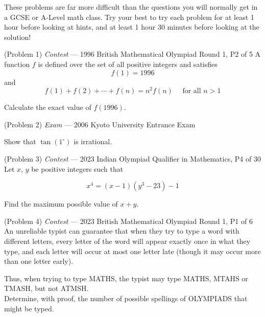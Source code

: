 \documentclass{article}
\begin{document}
These problems are far more difficult than the questions you will normally get in a GCSE or A-Level math class. Try your best to try each problem for at least 1 hour
before looking at hints, and at least 1 hour 30 minutes before looking at the solution!

\begin{problem}{(Problem 1) \textit{Contest} --- 1996 British Mathematical Olympiad Round 1, P2 of 5}
A function $f$ is defined over the set of all positive integers and satisfies
$$
f(1)=1996
$$
and
$$
f(1)+f(2)+\cdots+f(n)=n^2 f(n) \quad \text { for all } n>1
$$

Calculate the exact value of $f(1996)$.
\vspace{0.5cm}
\end{problem}

\vspace{-0.5cm}
\begin{problem}{(Problem 2) \textit{Exam} --- 2006 Kyoto University Entrance Exam}
\begin{center}
Show that $\tan(1^{\circ})$ is irrational.
\end{center}
\vspace{0.5cm}
\end{problem}

\vspace{-0.5cm}
\begin{problem}{(Problem 3) \textit{Contest} --- 2023 Indian Olympiad Qualifier in Mathematics, P4 of 30}
Let $x$, $y$ be positive integers such that

$$
x^4 = (x - 1)(y^3 - 23) - 1
$$

Find the maximum possible value of $x+y$.
\vspace{0.5cm}
\end{problem}

\vspace{-0.5cm}
\begin{problem}{(Problem 4) \textit{Contest} --- 2023 British Mathematical Olympiad Round 1, P1 of 6}
An unreliable typist can guarantee that when they try to type a word with
different letters, every letter of the word will appear exactly once in what
they type, and each letter will occur at most one letter late (though it may
occur more than one letter early).

Thus, when trying to type MATHS, the
typist may type MATHS, MTAHS or TMASH, but not ATMSH. \\

Determine, with proof, the number of possible spellings of OLYMPIADS
that might be typed.
\vspace{0.5cm}
\end{problem}
\end{document}

